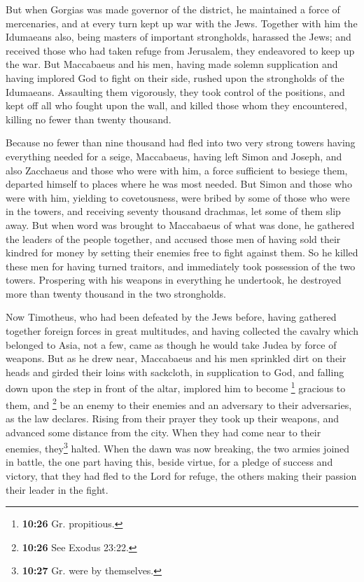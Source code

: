  But when Gorgias was made governor of the district, he
maintained a force of mercenaries, and at every turn kept up war with
the Jews.  Together with him the Idumaeans also, being
masters of important strongholds, harassed the Jews; and received those
who had taken refuge from Jerusalem, they endeavored to keep up the war.
 But Maccabaeus and his men, having made solemn
supplication and having implored God to fight on their side, rushed upon
the strongholds of the Idumaeans.  Assaulting them
vigorously, they took control of the positions, and kept off all who
fought upon the wall, and killed those whom they encountered, killing no
fewer than twenty thousand.

 Because no fewer than nine thousand had fled into two
very strong towers having everything needed for a seige, 
Maccabaeus, having left Simon and Joseph, and also Zacchaeus and those
who were with him, a force sufficient to besiege them, departed himself
to places where he was most needed.  But Simon and those
who were with him, yielding to covetousness, were bribed by some of
those who were in the towers, and receiving seventy thousand drachmas,
let some of them slip away.  But when word was brought to
Maccabaeus of what was done, he gathered the leaders of the people
together, and accused those men of having sold their kindred for money
by setting their enemies free to fight against them.  So
he killed these men for having turned traitors, and immediately took
possession of the two towers.  Prospering with his
weapons in everything he undertook, he destroyed more than twenty
thousand in the two strongholds.

 Now Timotheus, who had been defeated by the Jews before,
having gathered together foreign forces in great multitudes, and having
collected the cavalry which belonged to Asia, not a few, came as though
he would take Judea by force of weapons.  But as he drew
near, Maccabaeus and his men sprinkled dirt on their heads and girded
their loins with sackcloth, in supplication to God,  and
falling down upon the step in front of the altar, implored him to become
\footnote{\textbf{10:26} Gr. propitious.} gracious to them, and
\footnote{\textbf{10:26} See Exodus 23:22.} be an enemy to their enemies
and an adversary to their adversaries, as the law declares.
 Rising from their prayer they took up their weapons, and
advanced some distance from the city. When they had come near to their
enemies, they\footnote{\textbf{10:27} Gr. were by themselves.} halted.
 When the dawn was now breaking, the two armies joined in
battle, the one part having this, beside virtue, for a pledge of success
and victory, that they had fled to the Lord for refuge, the others
making their passion their leader in the fight.

